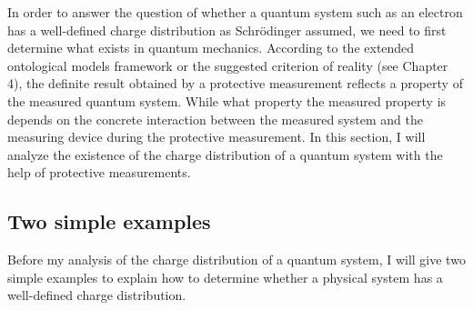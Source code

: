 In order to answer the question of whether a quantum system such as an electron has a well-defined charge distribution as Schr\"{o}dinger assumed, we need to first determine what exists in quantum mechanics.
According to the extended ontological models framework or the suggested criterion of reality (see Chapter 4),  
the definite result obtained by a protective measurement reflects a property of the measured quantum system.  
While what property the measured property is depends on the concrete interaction between the measured system and the measuring device during the protective measurement.  
In this section, I will analyze the existence of the charge distribution of a quantum system with the help of protective measurements.

\subsection{Two simple examples}

Before my analysis of the charge distribution of a quantum system, I will give two simple examples to explain how to determine whether a physical system has a well-defined charge distribution.


